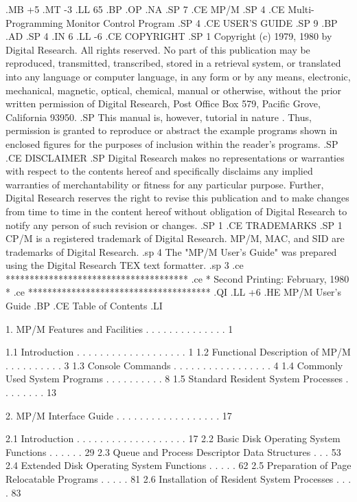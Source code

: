 .MB +5
.MT -3
.LL 65
.BP
.OP
.NA
.SP 7
.CE
MP/M
.SP 4
.CE
Multi-Programming Monitor Control Program
.SP 4
.CE
USER'S GUIDE
.SP 9
.BP
.AD
.SP 4
.IN 6
.LL -6
.CE
COPYRIGHT
.SP 1
Copyright (c) 1979, 1980 by Digital Research.  All rights
reserved.  No part of this publication may be reproduced,
transmitted, transcribed, stored in a retrieval system, or
translated into any language or computer language, in any
form or by any means, electronic, mechanical, magnetic,
optical, chemical, manual or otherwise, without the prior
written permission of Digital Research, Post Office Box 579,
Pacific Grove, California 93950.
.SP
This manual is, however, tutorial in nature .  Thus, permission
is granted to reproduce or abstract the example programs shown
in enclosed figures for the purposes of inclusion within the
reader's programs.
.SP
.CE
DISCLAIMER
.SP
Digital Research makes no representations or warranties with
respect to the contents hereof and specifically disclaims any
implied warranties of merchantability or fitness for any
particular purpose.  Further, Digital Research reserves the
right to revise this publication and to make changes from
time to time in the content hereof without obligation of
Digital Research to notify any person of such revision or
changes.
.SP 1
.CE
TRADEMARKS
.SP 1
CP/M is a registered trademark of Digital Research.  MP/M, MAC,
and SID are trademarks of Digital Research.
.sp 4
The "MP/M User's Guide" was prepared using the Digital Research
TEX text formatter.
.sp 3
.ce
**************************************
.ce
*  Second Printing:  February, 1980  *
.ce
**************************************
.QI
.LL +6
.HE MP/M User's Guide
.BP
.CE
Table of Contents
.LI



1.   MP/M Features and Facilities . . . . . . . . . . . . . .  1

     1.1   Introduction . . . . . . . . . . . . . . . . . . .  1
     1.2   Functional Description of MP/M . . . . . . . . . .  3
     1.3   Console Commands . . . . . . . . . . . . . . . . .  4
     1.4   Commonly Used System Programs  . . . . . . . . . .  8
     1.5   Standard Resident System Processes . . . . . . . . 13

2.   MP/M Interface Guide . . . . . . . . . . . . . . . . . . 17

     2.1   Introduction . . . . . . . . . . . . . . . . . . . 17
     2.2   Basic Disk Operating System Functions  . . . . . . 29
     2.3   Queue and Process Descriptor Data Structures . . . 53
     2.4   Extended Disk Operating System Functions . . . . . 62
     2.5   Preparation of Page Relocatable Programs . . . . . 81
     2.6   Installation of Resident System Processes  . . . . 83

